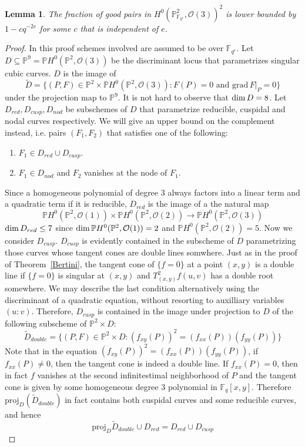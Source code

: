 \documentclass[12pt]{article}
\theoremstyle{plain}
\newtheorem{lemma}[equation]{Lemma}
\theoremstyle{definition}
\newcommand{\IF}{\mathbb{F}}
\newcommand{\IP}{\mathbb{P}}
\newcommand{\sO}{\mathcal{O}}
\renewcommand\dim{{\rm dim\,}}
\newcommand{\<}{\langle}
\renewcommand{\>}{\rangle}
\def\wt{\widetilde}
\newcommand{\grad}{\mathrm{grad}\,}
\newcommand{\proj}{\mathrm{proj}}
\begin{document}
\begin{lemma}
\label{pcount}
The fraction of good pairs in $H^0(\IP^2_{\IF_{q^e}}, \sO(3))^2$ is lower bounded by $1 - c q^{-2e}$ for some $c$ that is independent of $e$. 
\end{lemma}
\begin{proof}
In this proof schemes involved are assumed to be over $\IF_{q^e}$. Let $D \subseteq \IP^9 = \IP H^0(\IP^2, \sO(3))$ be the discriminant locus that parametrizes singular cubic curves. $D$ is the image of 
$$ \wt{D} = \{ (P, F) \in \IP^2 \times \IP H^0(\IP^2, \sO(3)) : F(P) =0 \text{ and } \grad F|_P = 0 \}$$ under the projection map to $\IP^9$. It is not hard to observe that $\dim D = 8$. Let $D_{red}, D_{cusp}, D_{nod}$ be subschemes of $D$ that parametrize reducible, cuspidal and nodal curves respectively. We will give an upper bound on the complement instead, i.e. pairs $(F_1, F_2)$ that satisfies one of the following:
\begin{enumerate}
\item $F_1 \in D_{red} \cup D_{cusp}$.
\item $F_1 \in D_{nod}$ and $F_2$ vanishes at the node of $F_1$.
\end{enumerate}
Since a homogeneous polynomial of degree $3$ always factors into a linear term and a quadratic term if it is reducible, $D_{red}$ is the image of a the natural map 
$$ \IP H^0(\IP^2, \sO(1)) \times \IP H^0(\IP^2, \sO(2)) \to \IP H^0(\IP^2, \sO(3))$$
$\dim D_{red} \le 7$ since $\dim \IP H^0(\IP^2, \sO(1)) = 2$ and $\IP H^0(\IP^2, \sO(2)) = 5$. Now we consider $D_{cusp}$. $D_{cusp}$ is evidently contained in the subscheme of $D$ parametrizing those curves whose tangent cones are double lines somwhere. Just as in the proof of Theorem~\ref{Bertini}, the tangent cone of $\{f=0\}$ at a point $(x, y)$ is a double line if $\{f=0\}$ is singular at $(x, y)$ and $T^2_{(x, y)}f(u, v)$ has a double root somewhere. We may describe the last condition alternatively using the discriminant of a quadratic equation, without resorting to auxilliary variables $(u : v)$. Therefore, $D_{cusp}$ is contained in the image under projection to $D$ of the following subscheme of $\IP^2 \times  D $:
$$ \wt{D}_{double} = \{ (P, F) \in \IP^2 \times D : (f_{xy}(P))^2 = (f_{xx}(P))(f_{yy}(P))\} $$
Note that in the equation $(f_{xy}(P))^2 = (f_{xx}(P))(f_{yy}(P))$, if $f_{xx}(P) \neq 0$, then the tangent cone is indeed a double line. If $f_{xx}(P) = 0$, then in fact $f$ vanishes at the second infinitestimal neighborhood of $P$ and the tangent cone is given by some homogeneous degree $3$ polynomial in $\IF_q[x, y]$. Therefore $\proj_D(\wt{D}_{double})$ in fact contains both cuspidal curves and some reducible curves, and hence $$\proj_D{\wt{D}_{double}} \cup D_{red} = D_{red} \cup D_{cusp}$$

\end{proof}
\end{document}
